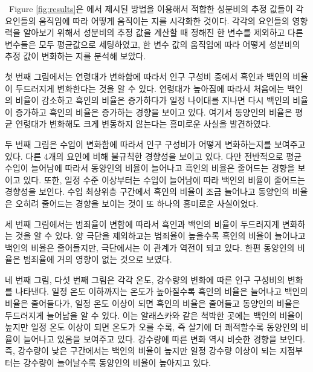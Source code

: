 \ \quad Figure \ref{fig:results}은 \citet{jeon2018additive}에서 제시된 방법을 이용해서 적합한 성분비의 추정 값들이 각 요인들의 움직임에 따라 어떻게 움직이는 지를 시각화한 것이다. 각각의 요인들의 영향력을 알아보기 위해서 성분비의 추정 값을 계산할 때 정해진 한 변수를 제외하고 다른 변수들은 모두 평균값으로 세팅하였고, 한 변수 값의 움직임에 따라 어떻게 성분비의 추정 값이 변화하는 지를 분석해 보았다. 

첫 번째 그림에서는 연령대가 변화함에 따라서 인구 구성비 중에서 흑인과 백인의 비율이 두드러지게 변화한다는 것을 알 수 있다. 연령대가 높아짐에 따라서 처음에는 백인의 비율이 감소하고 흑인의 비율은 증가하다가 일정 나이대를 지나면 다시 백인의 비율이 증가하고 흑인의 비율은 증가하는 경향을 보이고 있다. 여기서 동양인의 비율은 평균 연령대가 변화해도 크게 변동하지 않는다는 흥미로운 사실을 발견하였다. 

두 번째 그림은 수입이 변화함에 따라서 인구 구성비가 어떻게 변화하는지를 보여주고 있다. 다른 4개의 요인에 비해 불규칙한 경향성을 보이고 있다. 다만 전반적으로 평균 수입이 늘어남에 따라서 동양인의 비율이 늘어나고 흑인의 비율은 줄어드는 경향을 보이고 있다. 또한, 일정 수준 이상부터는 수입이 늘어남에 따라 백인의 비율이 줄어드는 경향성을 보인다. 수입 최상위층 구간에서 흑인의 비율이 조금 늘어나고 동양인의 비율은 오히려 줄어드는 경향을 보이는 것이 또 하나의 흥미로운 사실이었다.

세 번째 그림에서는 범죄율이 변함에 따라서 흑인과 백인의 비율이 두드러지게 변화하는 것을 알 수 있다. 양 극단을 제외하고는 범죄율이 높을수록 흑인의 비율이 늘어나고 백인의 비율은 줄어들지만, 극단에서는 이 관계가 역전이 되고 있다. 한편 동양인의 비율은 범죄율에 거의 영향이 없는 것으로 보였다. 

네 번째 그림, 다섯 번째 그림은 각각 온도, 강수량의 변화에 따른 인구 구성비의 변화를 나타낸다. 일정 온도 이하까지는 온도가 높아질수록 흑인의 비율은 늘어나고 백인의 비율은 줄어들다가, 일정 온도 이상이 되면 흑인의 비율은 줄어들고 동양인의 비율은 두드러지게 늘어남을 알 수 있다. 이는 알래스카와 같은 척박한 곳에는 백인의 비율이 높지만 일정 온도 이상이 되면 온도가 오를 수록, 즉 살기에 더 쾌적할수록 동양인의 비율이 늘어나고 있음을 보여주고 있다. 강수량에 따른 변화 역시 비슷한 경향을 보인다. 즉, 강수량이 낮은 구간에서는 백인의 비율이 높지만 일정 강수량 이상이 되는 지점부터는 강수량이 늘어날수록 동양인의 비율이 높아지고 있다.


